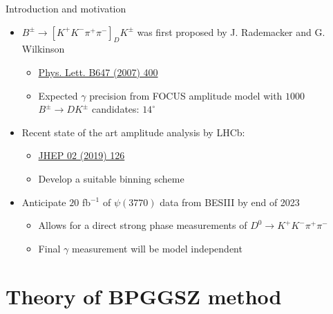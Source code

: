 \documentclass{beamer}
\begin{document}
\begin{frame}{Introduction and motivation}
  \vspace{0.5cm}
  \begin{itemize}
    \setlength\itemsep{1.2em}
    \item{$B^\pm\to[K^+K^-\pi^+\pi^-]_D K^\pm$ was first proposed by J. Rademacker and G. Wilkinson}
    \begin{itemize}
      \item{\href{https://arxiv.org/abs/hep-ph/0611272}{Phys. Lett. B647 (2007) 400}}
      \item{Expected $\gamma$ precision from FOCUS amplitude model with $1000$ $B^\pm\to DK^\pm$ candidates: $14^\circ$}
    \end{itemize}
    \item{Recent state of the art amplitude analysis by LHCb:}
    \begin{itemize}
      \item{\href{https://arxiv.org/abs/1811.08304}{JHEP 02 (2019) 126}}
      \item{Develop a suitable binning scheme}
    \end{itemize}
    \item{Anticipate $20$ fb$^{-1}$ of $\psi(3770)$ data from BESIII by end of 2023}
    \begin{itemize}
      \item{Allows for a direct strong phase measurements of $D^0\to K^+K^-\pi^+\pi^-$}
      \item{Final $\gamma$ measurement will be model independent}
    \end{itemize}
  \end{itemize}
\end{frame}

\section{Theory of BPGGSZ method}
\end{document}
